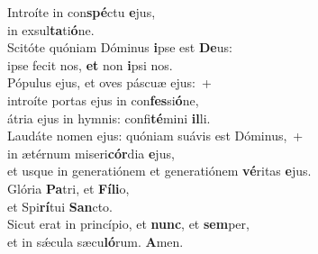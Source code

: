 \evenverse Introíte in con\textbf{spé}ctu \textbf{e}jus,~\*\\
\evenverse in exsul\textbf{ta}ti\textbf{ó}ne.\\
\oddverse Scitóte quóniam Dóminus \textbf{i}pse est \textbf{De}us:~\*\\
\oddverse ipse fecit nos, \textbf{et} non \textbf{i}psi nos.\\
\evenverse Pópulus ejus, et oves páscuæ ejus:~+\\
\evenverse  introíte portas ejus in con\textbf{fes}si\textbf{ó}ne,~\*\\
\evenverse átria ejus in hymnis: confi\textbf{té}mini \textbf{il}li.\\
\oddverse Laudáte nomen ejus: quóniam suávis est Dóminus,~+\\
\oddverse  in ætérnum miseri\textbf{cór}dia \textbf{e}jus,~\*\\
\oddverse et usque in generatiónem et generatiónem \textbf{vé}ritas \textbf{e}jus.\\
\evenverse Glória \textbf{Pa}tri, et \textbf{Fí}\textbf{li}o,~\*\\
\evenverse et Spi\textbf{rí}tui \textbf{San}cto.\\
\oddverse Sicut erat in princípio, et \textbf{nunc}, et \textbf{sem}per,~\*\\
\oddverse et in sǽcula sæcu\textbf{ló}rum. \textbf{A}men.\\
